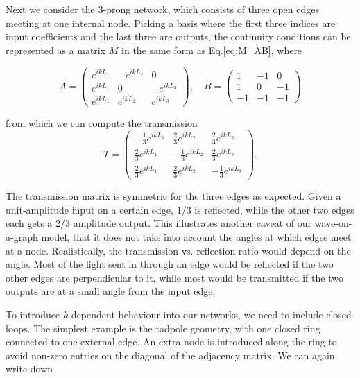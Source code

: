 Next we consider the 3-prong network, which consists of three open edges meeting at one internal node. Picking a basis where the first three indices are input coefficients and the last three are outputs, the continuity conditions can be represented as a matrix $M$ in the same form as Eq.\ref{eq:M_AB}, where

\begin{equation}
    \label{eq:AB_3prong}
    A = \begin{pmatrix}
    e^{ikL_1} & -e^{ikL_2} & 0           \\[0.3em]
       e^{ikL_1} & 0           & -e^{ikL_3} \\[0.3em]
       e^{ikL_1}  & e^{ikL_2} & e^{ikL_3} \end{pmatrix}, \quad
    B = \begin{pmatrix}
        1 & -1 & 0           \\[0.3em]
        1 & 0 & -1 \\[0.3em]
        -1  & -1 & -1 \end{pmatrix}
\end{equation}

from which we can compute the transmission
\begin{equation}
    \label{eq:T_3prong}
    T = \begin{pmatrix}
    -\frac{1}{3}e^{ikL_1} & \frac{2}{3}e^{ikL_2} & \frac{2}{3}e^{ikL_3} \\[0.3em]
    \frac{2}{3}e^{ikL_1} & -\frac{1}{3}e^{ikL_2} & \frac{2}{3}e^{ikL_3} \\[0.3em]
    \frac{2}{3}e^{ikL_1}  & \frac{2}{3}e^{ikL_2} & -\frac{1}{3}e^{ikL_3} \end{pmatrix}.
\end{equation}

The transmission matrix is symmetric for the three edges as expected. Given a unit-amplitude input on a certain edge, $1/3$ is reflected, while the other two edges each gets a $2/3$ amplitude output. This illustrates another caveat of our wave-on-a-graph model, that it does not take into account the angles at which edges meet at a node. Realistically, the transmission vs. reflection ratio would depend on the angle. Most of the light sent in through an edge would be reflected if the two other edges are perpendicular to it, while most would be transmitted if the two outputs are at a small angle from the input edge. 

To introduce $k$-dependent behaviour into our networks, we need to include closed loops. The simplest example is the tadpole geometry, with one closed ring connected to one external edge. An extra node is introduced along the ring to avoid non-zero entries on the diagonal of the adjacency matrix. We can again write down  

